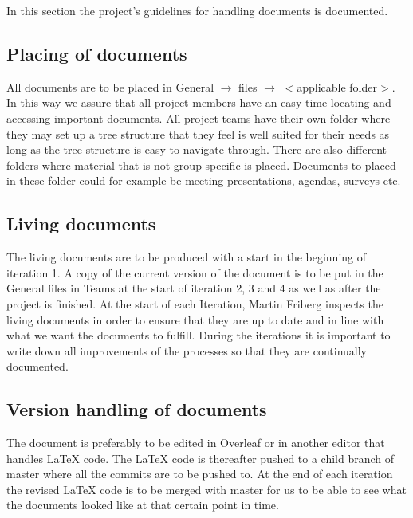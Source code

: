 In this section the project's guidelines for handling documents is documented. 

\subsection{Placing of documents} 
All documents are to be placed in General $\rightarrow$ files $\rightarrow$  \(<\)applicable folder\(>\). In this way we assure that all project members have an easy time locating and accessing important documents. All project teams have their own folder where they may set up a tree structure that they feel is well suited for their needs as long as the tree structure is easy to navigate through. There are also different folders where material that is not group specific is placed. Documents to placed in these folder could for example be meeting presentations, agendas, surveys etc. 

\subsection{Living documents} 
The living documents are to be produced with a start in the beginning of iteration 1. A copy of the current version of the document is to be put in the General files in Teams at the start of iteration 2, 3 and 4 as well as after the project is finished. At the start of each Iteration, Martin Friberg inspects the living documents in order to ensure that they are up to date and in line with what we want the documents to fulfill. During the iterations it is important to write down all improvements of the processes so that they are continually documented.

\subsection{Version handling of documents} 
The document is preferably to be edited in Overleaf or in another editor that handles LaTeX code. The LaTeX code is thereafter pushed to a child branch of master where all the commits are to be pushed to. At the end of each iteration the revised LaTeX code is to be merged with master for us to be able to see what the documents looked like at that certain point in time. 